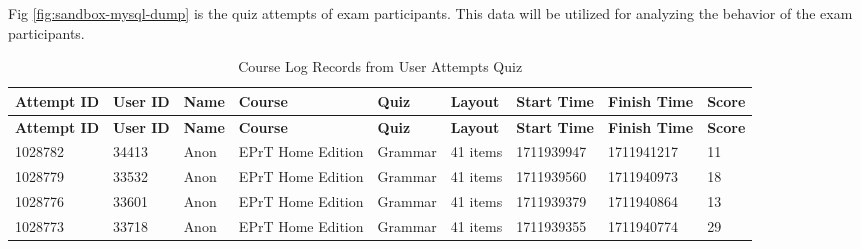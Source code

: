 Fig \ref{fig:sandbox-mysql-dump} is the quiz attempts of exam participants. This data will be utilized for analyzing the behavior of the exam participants.


\begin{longtable}{|p{1.3cm}|p{1.5cm}|p{1.2cm}|p{2.1cm}|p{1.5cm}|p{1.5cm}|p{1.8cm}|p{1.8cm}|p{0.8cm}|}
\caption{Course Log Records from User Attempts Quiz} \label{tab:quiz-attempts-log} \\
\hline
\textbf{Attempt ID} & \textbf{User ID} & \textbf{Name} & \textbf{Course} & \textbf{Quiz} & \textbf{Layout} & \textbf{Start Time} & \textbf{Finish Time} & \textbf{Score} \\
\hline
\endfirsthead

\hline
\textbf{Attempt ID} & \textbf{User ID} & \textbf{Name} & \textbf{Course} & \textbf{Quiz} & \textbf{Layout} & \textbf{Start Time} & \textbf{Finish Time} & \textbf{Score} \\
\hline
\endhead

1028782 & 34413 & Anon & EPrT Home Edition & Grammar & 41 items & 1711939947 & 1711941217 & 11 \\
\hline
1028779 & 33532 & Anon & EPrT Home Edition & Grammar & 41 items & 1711939560 & 1711940973 & 18 \\
\hline
1028776 & 33601 & Anon & EPrT Home Edition & Grammar & 41 items & 1711939379 & 1711940864 & 13 \\
\hline
1028773 & 33718 & Anon & EPrT Home Edition & Grammar & 41 items & 1711939355 & 1711940774 & 29 \\
\hline

\end{longtable}

